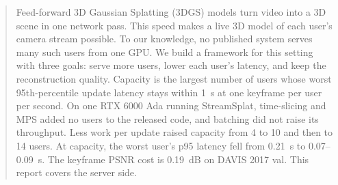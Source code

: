 \begin{abstract}
Feed-forward 3D Gaussian Splatting (3DGS) models turn video into a 3D scene in one network pass.
This speed makes a live 3D model of each user's camera stream possible.
To our knowledge, no published system serves many such users from one GPU.
We build a framework for this setting with three goals: serve more users, lower each user's latency, and keep the reconstruction quality.
Capacity is the largest number of users whose worst 95th-percentile update latency stays within 1~s at one keyframe per user per second.
On one RTX 6000 Ada running StreamSplat, time-slicing and MPS added no users to the released code, and batching did not raise its throughput. %
Less work per update raised capacity from 4 to 10 and then to 14 users. %
At capacity, the worst user's p95 latency fell from 0.21~s to 0.07--0.09~s. %
The keyframe PSNR cost is 0.19~dB on DAVIS 2017 val. %
This report covers the server side.
\end{abstract}
